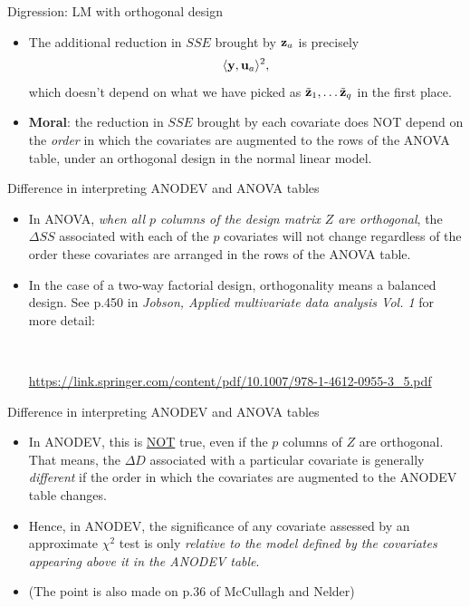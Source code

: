 \documentclass{beamer}
\newenvironment{wideitemize}%
  {\begin{itemize}%
    \setlength{\parskip}{1em}}%
  {\end{itemize}}
\begin{document}
\begin{frame} {Digression: LM with orthogonal design}
\begin{wideitemize}
\item The additional reduction in $SSE$ brought by ${\bf z}_a$ is precisely 
\[
 \langle {\bf y}, {\bf u}_a\rangle^2,
\]
which doesn't depend on what we have picked as $\tilde{\bf z}_1, \dots \tilde{\bf z}_q$ in the first place. 

\item {\bf Moral}: the reduction in $SSE$ brought by each covariate does NOT depend on the \emph{order} in which the covariates are augmented to the rows of the ANOVA table, under an orthogonal design in the normal linear model.


\end{wideitemize}


\end{frame}


\begin{frame} {Difference in interpreting ANODEV and ANOVA tables}
\begin{wideitemize}
\item In ANOVA, \emph{when all $p$ columns of the design matrix $Z$ are orthogonal}, the $\Delta SS$ associated with each of  the $p$ covariates  will not change regardless of the order these covariates are arranged in the rows of the ANOVA table. 

\item In the case of a two-way factorial design, orthogonality means a balanced design. See p.450 in \emph{Jobson, Applied multivariate data analysis Vol. 1} for more detail:

\ \

\url{https://link.springer.com/content/pdf/10.1007/978-1-4612-0955-3_5.pdf}

\end{wideitemize}
\end{frame}


\begin{frame} {Difference in interpreting ANODEV and ANOVA tables}
\begin{wideitemize}



\item In ANODEV, this is \underline{NOT} true, even if the $p$ columns of $Z$ are orthogonal. That means, the $\Delta D$ associated with a particular covariate is generally \emph{different} if the order in which the covariates are augmented to the ANODEV table changes. 



\item Hence, in ANODEV, the significance of any covariate assessed by an approximate $\chi^2$ test is only \emph{relative to the model defined by the covariates appearing above it in the ANODEV table}. 

\item (The point is also made on p.36 of McCullagh and Nelder)



\end{wideitemize}
\end{frame}
\end{document}
